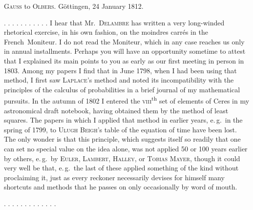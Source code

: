 \clearpage
{}
\begin{center}
\textsc{Gauss} to \textsc{Olbers}. Göttingen, 24 January 1812.
\end{center}

\noindent . . . . . . . . . . . I hear that Mr.\ \textsc{Delambre} has written a very long-winded rhetorical exercise, in his own fashion, on the moindres carrés in the French\ Moniteur. I do not read the Moniteur, which in any case reaches us only in annual installments. Perhaps you will have an opportunity sometime to attest  that I explained its main points to you as early as our first meeting in person in 1803. Among my papers I find that in June 1798, when I had  been using that method, I first saw \textsc{Laplace}'s method and noted its incompatibility with the principles of the calculus of probabilities in a brief journal of my mathematical pursuits. In the autumn of 1802 I entered the \textsc{viii}\textsuperscript{th} set of elements of Ceres in my astronomical draft notebook, having obtained them by the method of least squares. The papers in which I applied that method in earlier years, e.\,g.\ in the spring of 1799, to \textsc{Ulugh Beigh}'s table of the equation of time have been lost. The only wonder is that this principle, which suggests itself so readily that one can set no special value on the idea alone, was not applied 50 or 100 years earlier by others, e.\,g.\ by \textsc{Euler}, \textsc{Lambert}, \textsc{Halley}, or \textsc{Tobias Mayer}, though it could very well be that, e.\,g.\ the last of these applied something of the kind without proclaiming it, just as every reckoner necessarily devises for himself many shortcuts and methods that he passes on only occasionally by word of mouth.

\noindent . . . . . . . . . . . . .

